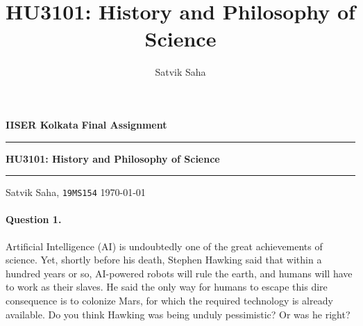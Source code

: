 \documentclass[11pt]{article}
\title{HU3101: History and Philosophy of Science}
\author{Satvik Saha}
\date{}
\theoremstyle{remark}
\begin{document}
    \noindent\textbf{IISER Kolkata} \hfill \textbf{Final Assignment}
    \vspace{3pt}
    \hrule
    \vspace{3pt}
    \begin{center}
    \LARGE{\textbf{HU3101: History and Philosophy of Science}}
    \end{center}
    \vspace{3pt}
    \hrule
    \vspace{3pt}
    Satvik Saha, \texttt{19MS154} \hfill \today
    \vspace{20pt}

    \paragraph{Question 1.} Artificial Intelligence (AI) is undoubtedly one of the
    great achievements of science. Yet, shortly before his death, Stephen Hawking
    said that within a hundred years or so, AI-powered robots will rule the earth,
    and humans will have to work as their slaves. He said the only way for humans to
    escape this dire consequence is to colonize Mars, for which the required
    technology is already available. Do you think Hawking was being unduly
    pessimistic? Or was he right?
\end{document}
